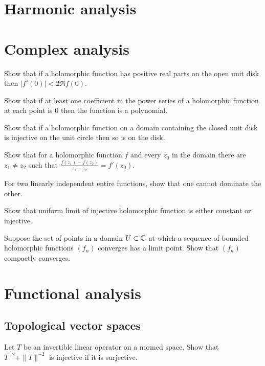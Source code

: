 \documentclass[12pt]{article}
\begin{document}
\section{Harmonic analysis}
\section{Complex analysis}

	\begin{prb}
	Show that if a holomorphic function has positive real parts on the open unit disk then $|f'(0)|<2\Re f(0)$.
	\end{prb}

	\begin{prb}
	Show that if at least one coefficient in the power series of a holomorphic function at each point is 0 then the function is a polynomial.
	\end{prb}

	\begin{prb}
	Show that if a holomorphic function on a domain containing the closed unit disk is injective on the unit circle then so is on the disk.
	\end{prb}

	\begin{prb}
	Show that for a holomorphic function $f$ and every $z_0$ in the domain there are $z_1\ne z_2$ such that $\frac{f(z_1)-f(z_2)}{z_1-z_2}=f'(z_0)$.
	\end{prb}

	\begin{prb}
	For two linearly independent entire functions, show that one cannot dominate the other.
	\end{prb}

	\begin{prb}
	Show that uniform limit of injective holomorphic function is either constant or injective.
	\end{prb}

	\begin{prb}
	Suppose the set of points in a domain $U\subset\mathbb{C}$ at which a sequence of bounded holomorphic functions $(f_n)$ converges has a limit point. Show that $(f_n)$ compactly converges.
	\end{prb}



\section{Functional analysis}
	\subsection{Topological vector spaces}
	\begin{prb}
	Let $T$ be an invertible linear operator on a normed space.
	Show that $T^{-2}+\|T\|^{-2}$ is injective if it is surjective.
	\end{prb}
\end{document}
